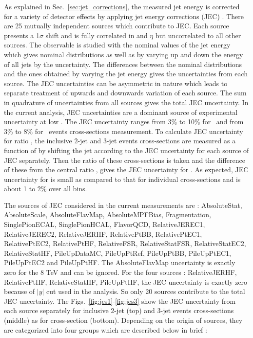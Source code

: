 As explained in Sec.~\ref{sec:jet_corrections}, the measured jet energy is corrected for a variety of detector effects by applying jet energy corrections (JEC) \cite{Khachatryan:2016kdb}. There are 25 mutually independent sources which contribute to JEC. Each source presents a 1$\sigma$ shift and is fully correlated in \pt and $\eta$ but uncorrelated to all other sources. The observable is studied with the nominal values of the jet energy which gives nominal distributions as well as by varying up and down the energy of all jets by the uncertainty. The differences between the nominal distributions and the ones obtained by varying the jet energy gives the uncertainties from each source. The JEC uncertainties can be asymmetric in nature which leads to separate treatment of upwards and downwards variation of each source. The sum in quadrature of uncertainties from all sources gives the total JEC uncertainty. In the current analysis, JEC uncertainties are a dominant source of experimental uncertainty at low \httwo. The JEC uncertainty ranges from 3\% to 10\% for \njt~and from 3\% to 8\% for \njth~events cross-sections measurement. To calculate JEC uncertainty for ratio \rations, the inclusive 2-jet and 3-jet events cross-sections are measured as a function of \httwo by shifting the jet \pt according to the JEC uncertainty for each source of JEC separately. Then the ratio of these cross-sections is taken and the difference of these from the central ratio \rations, gives the JEC uncertainty for \ratio. As expected, JEC uncertainty for \ratio is small as compared to that for individual cross-sections and is about 1 to 2\% over all \httwo bins.

 The sources of JEC considered in the current measurements are : AbsoluteStat, AbsoluteScale, AbsoluteFlavMap, AbsoluteMPFBias, Fragmentation, SinglePionECAL, SinglePionHCAL, FlavorQCD, RelativeJEREC1, RelativeJEREC2, RelativeJERHF, RelativePtBB, RelativePtEC1, RelativePtEC2, RelativePtHF, RelativeFSR, RelativeStatFSR, RelativeStatEC2, RelativeStatHF, PileUpDataMC, PileUpPtRef, PileUpPtBB, PileUpPtEC1, PileUpPtEC2 and PileUpPtHF. The AbsoluteFlavMap uncertainty is exactly zero for the 8 TeV and can be ignored. For the four sources : RelativeJERHF, RelativePtHF, RelativeStatHF, PileUpPtHF, the JEC uncertainty is exactly zero because of $|y|$  cut used in the analysis. So only 20 sources contribute to the total JEC uncertainty. The Figs.~\ref{fig:jes1}-\ref{fig:jes3} show the JEC uncertainty from each source separately for inclusive 2-jet (top) and 3-jet events cross-sections (middle) as for cross-section \ratio (bottom). Depending on the origin of sources, they are categorized into four groups which are described below in brief :

